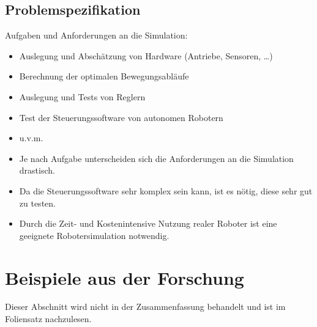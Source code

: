     \section{Problemspezifikation} %
        Aufgaben und Anforderungen an die Simulation:
        \begin{itemize}
        	\item Auslegung und Abschätzung von Hardware (Antriebe, Sensoren, \dots)
        	\item Berechnung der optimalen Bewegungsabläufe
        	\item Auslegung und Tests von Reglern
        	\item Test der Steuerungssoftware von autonomen Robotern
        	\item u.v.m.
        	\item Je nach Aufgabe unterscheiden sich die Anforderungen an die Simulation drastisch.
        	\item Da die Steuerungssoftware sehr komplex sein kann, ist es nötig, diese sehr gut zu testen.
        	\item Durch die Zeit- und Kostenintensive Nutzung realer Roboter ist eine geeignete Robotersimulation notwendig.
        \end{itemize}

\chapter{Beispiele aus der Forschung} %
    Dieser Abschnitt wird nicht in der Zusammenfassung behandelt und ist im Foliensatz nachzulesen.
